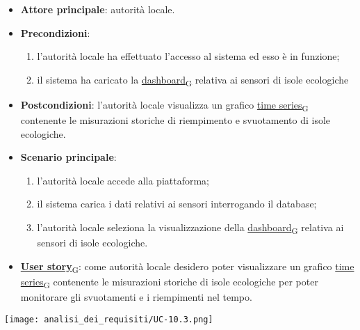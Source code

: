 \begin{itemize}
	\item \textbf{Attore principale}: autorità locale.
	\item \textbf{Precondizioni}:
	      \begin{enumerate}
		      \item l'autorità locale ha effettuato l'accesso al sistema ed esso è in funzione;
		      \item il sistema ha caricato la \href{https://7last.github.io/docs/rtb/documentazione-interna/glossario\#dashboard}{dashboard\textsubscript{G}} relativa ai sensori di isole ecologiche
	      \end{enumerate}
	\item \textbf{Postcondizioni}: l'autorità locale visualizza un grafico \href{https://7last.github.io/docs/rtb/documentazione-interna/glossario\#time-series}{time series\textsubscript{G}} contenente le misurazioni storiche di riempimento e svuotamento
	      di isole ecologiche.
	\item \textbf{Scenario principale}:
	      \begin{enumerate}
		      \item l'autorità locale accede alla piattaforma;
		      \item il sistema carica i dati relativi ai sensori interrogando il database;
		      \item l'autorità locale seleziona la visualizzazione della \href{https://7last.github.io/docs/rtb/documentazione-interna/glossario\#dashboard}{dashboard\textsubscript{G}} relativa ai sensori di isole ecologiche.
	      \end{enumerate}
	\item \href{https://7last.github.io/docs/rtb/documentazione-interna/glossario\#user-story}{\textbf{User story}\textsubscript{G}}:
	      come autorità locale desidero poter visualizzare un grafico \href{https://7last.github.io/docs/rtb/documentazione-interna/glossario\#time-series}{time series\textsubscript{G}} contenente le misurazioni storiche
	      di isole ecologiche per poter monitorare gli svuotamenti e i riempimenti nel tempo.
\end{itemize}
\begin{center}
	\texttt{[image: analisi\_dei\_requisiti/UC-10.3.png]}
\end{center}

